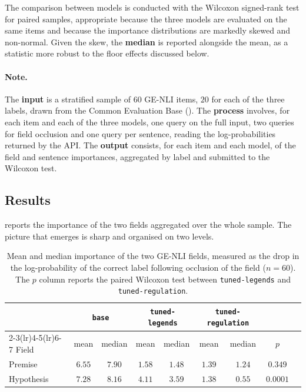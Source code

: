 \documentclass[pdflatex, sn-apa]{sn-jnl}%
\theoremstyle{thmstyleone}%
\theoremstyle{thmstyletwo}%
\theoremstyle{thmstylethree}%
\newcommand{\modelbase}{\texttt{base}}
\newcommand{\modellegends}{\texttt{tuned-legends}}
\newcommand{\modelreg}{\texttt{tuned-regulation}}
\begin{document}
The comparison between models is conducted with the Wilcoxon signed-rank test for
paired samples, appropriate because the three models are evaluated on the same
items and because the importance distributions are markedly skewed and
non-normal. Given the skew, the \textbf{median} is reported alongside the mean, as
a statistic more robust to the floor effects discussed below.

\paragraph{Note.}
The \textbf{input} is a stratified sample of $60$ GE-NLI items, $20$ for each of
the three labels, drawn from the Common Evaluation Base
(). The \textbf{process} involves, for each item and each of
the three models, one query on the full input, two queries for field occlusion
and one query per sentence, reading the log-probabilities returned by the API.
The \textbf{output} consists, for each item and each model, of the field and
sentence importances, aggregated by label and submitted to the Wilcoxon test.

\subsection{Results}
\label{sec:xai:results}

 reports the importance of the two fields aggregated over
the whole sample. The picture that emerges is sharp and organised on two levels.

\begin{table}[h]
\centering
\caption{Mean and median importance of the two GE-NLI fields, measured as the
drop in the log-probability of the correct label following occlusion of the field
($n=60$). The $p$ column reports the paired Wilcoxon test between \modellegends{}
and \modelreg{}.}
\label{tab:xai_fields}
\small
\begin{tabular}{@{}lcccccccc@{}}
\toprule
& \multicolumn{2}{c}{\modelbase} & \multicolumn{2}{c}{\modellegends} & \multicolumn{2}{c}{\modelreg} & \\
\cmidrule(lr){2-3}\cmidrule(lr){4-5}\cmidrule(lr){6-7}
Field & mean & median & mean & median & mean & median & $p$ \\
\midrule
Premise    & $6.55$ & $7.90$ & $1.58$ & $1.48$ & $1.39$ & $1.24$ & $0.349$ \\
Hypothesis & $7.28$ & $8.16$ & $4.11$ & $3.59$ & $1.38$ & $0.55$ & $\mathbf{0.0001}$ \\
\bottomrule
\end{tabular}
\end{table}
\end{document}

